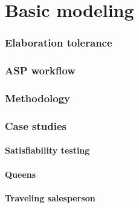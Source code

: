 \part{Basic modeling}

\section{Elaboration tolerance}

\section{ASP workflow}


\section{Methodology}


\section{Case studies}
\subsection{Satisfiability testing}

\subsection{Queens}


\subsection{Traveling salesperson}


